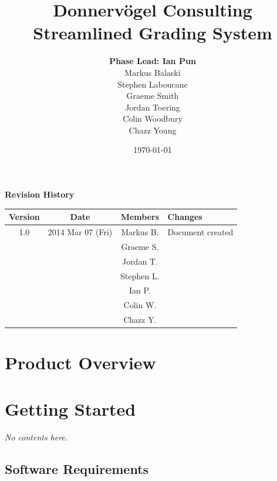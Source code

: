 \documentclass{article}
\begin{document}
\title{Donnervögel Consulting \\ Streamlined Grading System}
\author{\textbf{Phase Lead: Ian Pun} \\ Markus Balaski \\ Stephen Laboucane \\
  Graeme Smith \\ Jordan Toering \\  Colin Woodbury \\ Chazz Young}
\date{\today}
\maketitle
\clearpage

\textbf{Revision History}
\begin{center}
  \begin{tabular}{| c | c | c | l |}
    \hline
    Version & Date & Members & Changes\\
    \hline
    1.0 & 2014 Mar 07 (Fri) & Markus B. & Document created\\
    & & Graeme S. & \\
    & & Jordan T. & \\
    & & Stephen L. & \\
    & & Ian P. & \\
    & & Colin W. & \\
    & & Chazz Y. & \\
    \hline
  \end{tabular}
\end{center}
\clearpage

\tableofcontents
\clearpage

\section{Product Overview}  %

\section{Getting Started}
\emph{No contents here.}

\subsection{Software Requirements}
\end{document}

